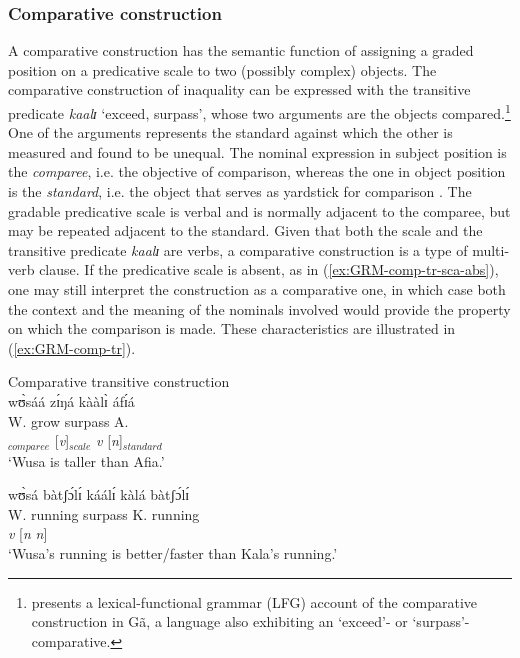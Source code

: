 \subsubsection{Comparative construction}
\label{sec:GRM-compar-ct}

A comparative construction has the semantic function of assigning a graded
position on a predicative scale to two (possibly complex) objects.
The comparative construction of inaquality can be expressed with the
transitive predicate {\it kaalɪ} `exceed, surpass', whose  two arguments are
the objects compared.\footnote{\citet{Brin05} presents a lexical-functional
grammar (LFG)  account of the comparative construction in Gã, a language also
exhibiting an  `exceed'-  or `surpass'-comparative.}  One of the arguments 
represents the
standard
against which the other is
measured and found to be unequal.  The nominal expression in subject position is
the {\it comparee}, i.e. the objective of comparison, whereas the
one in object position is the {\it standard}, i.e. the object that
serves as yardstick for comparison \citep{Stas08}. The gradable
predicative scale is verbal and is normally adjacent to  the comparee, but may
be repeated adjacent to the standard. Given that both the scale and the
transitive predicate {\it kaalɪ} are verbs, a comparative construction is  a
 type of multi-verb clause.  If the predicative scale is absent, as in
(\ref{ex:GRM-comp-tr-sca-abs}),  one
may still interpret the construction as a comparative one, in which case both
the
context
and the meaning of  the nominals involved would provide the property on which
the
comparison  is made. These characteristics are illustrated in
(\ref{ex:GRM-comp-tr}).


\ea\label{ex:GRM-comp-tr}{\rm Comparative transitive construction}\\
\ea\label{ex:GRM-comp-tr-sca-pres}{
\glll wʊ̀sáá zɪ́ŋá kààlɪ̀ áfɪ́á\\
     W. grow surpass A.\\
[{\it n}]$_{comparee}$  [{\it v}]$_{scale}$ {\it v} [{\it n}]$_{standard}$ \\
\glt `Wusa is taller than Afia.'
}

\ex\label{ex:GRM-comp-tr-sca-abs}{
\glll wʊ̀sá bàtʃɔ́lɪ́ káálɪ́ kàlá bàtʃɔ́lɪ́\\
W.  running surpass K. running\\
[{\it n}  {\it n}]  {\it v} [{\it n} {\it n}]  \\
\glt `Wusa's running is better/faster than Kala's running.'
}

